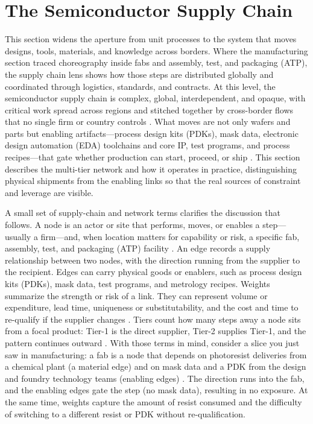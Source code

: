 \section{The Semiconductor Supply Chain}
\label{sec:sc-network}

This section widens the aperture from unit processes to the system that moves designs, tools, materials, and knowledge across borders. Where the manufacturing section traced choreography inside fabs and assembly, test, and packaging (ATP), the supply chain lens shows how those steps are distributed globally and coordinated through logistics, standards, and contracts. At this level, the semiconductor supply chain is complex, global, interdependent, and opaque, with critical work spread across regions and stitched together by cross-border flows that no single firm or country controls \parencite{thadani_mapping_2023,oecd_measuring_2019}. What moves are not only wafers and parts but enabling artifacts---process design kits (PDKs), mask data, electronic design automation (EDA) toolchains and core IP, test programs, and process recipes---that gate whether production can start, proceed, or ship \parencite{neisser_international_2021, palma_growing_2022}. This section describes the multi-tier network and how it operates in practice, distinguishing physical shipments from the enabling links so that the real sources of constraint and leverage are visible.

A small set of supply-chain and network terms clarifies the discussion that follows. A node is an actor or site that performs, moves, or enables a step---usually a firm---and, when location matters for capability or risk, a specific fab, assembly, test, and packaging (ATP) facility \parencite{newman_networks_2010}. An edge records a supply relationship between two nodes, with the direction running from the supplier to the recipient. Edges can carry physical goods or enablers, such as process design kits (PDKs), mask data, test programs, and metrology recipes. Weights summarize the strength or risk of a link. They can represent volume or expenditure, lead time, uniqueness or substitutability, and the cost and time to re-qualify if the supplier changes \parencite{borgatti_social_2009}. Tiers count how many steps away a node sits from a focal product: Tier-1 is the direct supplier, Tier-2 supplies Tier-1, and the pattern continues outward \parencite{jackson_social_2008, newman_networks_2010}. With those terms in mind, consider a slice you just saw in manufacturing: a fab is a node that depends on photoresist deliveries from a chemical plant (a material edge) and on mask data and a PDK from the design and foundry technology teams (enabling edges) \parencite{khan_semiconductor_2021}. The direction runs into the fab, and the enabling edges gate the step (no mask data), resulting in no exposure. At the same time, weights capture the amount of resist consumed and the difficulty of switching to a different resist or PDK without re-qualification.

